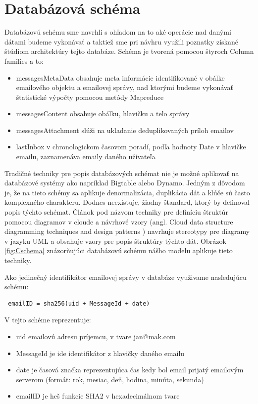 \documentclass[11pt,twoside,a4paper]{book}
\begin{document}

\section{Databázová schéma}

Databázovú schému sme navrhli s ohľadom na to aké operácie nad danými dátami budeme vykonávať a taktiež sme pri návhru využili poznatky získané štúdiom architektúry tejto databáze. Schéma je tvorená pomocou štyroch Column families a to:

\begin{itemize}
 \item messagesMetaData obsahuje meta informácie identifikované v obálke emailového objektu a emailovej správy, nad ktorými budeme vykonávať štatistické výpočty pomocou metódy Mapreduce
 \item messagesContent obsahuje obálku, hlavičku a telo správy
 \item messagesAttachment slúži na ukladanie deduplikovaných príloh emailov  
 \item lastInbox v chronologickom časovom poradí, podľa hodnoty Date v hlavičke emailu, zaznamenáva emaily daného užívateľa
\end{itemize}

Tradičné techniky pre popis databázových schémat nie je možné aplikovať na databázové systémy ako napríklad Bigtable alebo Dynamo. Jedným z dôvodom je, že na tieto schémy sa aplikuje denormalizácia, duplikácia dát a klúče sú často komplexného charakteru. Dodnes neexistuje, žiadny štandard, ktorý by definoval popis týchto schémat. Článok pod názvom techniky pre definíciu štruktúr pomocou diagramov v cloude a návrhové vzory (angl. Cloud data structure diagramming techniques and design patterns \cite{CloudDataStructureDiag}) navrhuje stereotypy pre diagramy v jazyku UML a obsahuje vzory pre popis štruktúry týchto dát. Obrázok \ref{fig:Cschema} znázorňujúci databázovú schému nášho modelu aplikuje tieto techniky.

Ako jedinečný identifikátor emailovej správy v databáze využivame nasledujúcu schému:
\begin{verbatim}
 emailID = sha256(uid + MessageId + date)
\end{verbatim}

V tejto schéme reprezentuje:
\begin{itemize}
 \item uid emailovú adresu príjemcu, v tvare jan@mak.com
 \item MessageId je ide identifikátor z hlavičky daného emailu
 \item date je časová značka reprezentujúca čas kedy bol email prijatý emailovým serverom (formát: rok, mesiac, deň, hodina, minúta, sekunda)
 \item emailID je heš funkcie SHA2 v hexadecimálnom tvare
\end{itemize}
\end{document}

